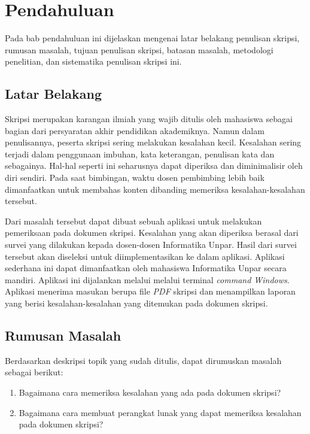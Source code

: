 \chapter{Pendahuluan}
\label{chap:intro}
   
Pada bab pendahuluan ini dijelaskan mengenai latar belakang penulisan skripsi, rumusan masalah, tujuan penulisan skripsi, batasan masalah, metodologi penelitian, dan sistematika penulisan skripsi ini.

\section{Latar Belakang}
\label{sec:label}

Skripsi merupakan karangan ilmiah yang wajib ditulis oleh mahasiswa sebagai bagian dari persyaratan akhir pendidikan akademiknya. Namun dalam penulisannya, peserta skripsi sering melakukan kesalahan kecil. Kesalahan sering terjadi dalam penggunaan imbuhan, kata keterangan, penulisan kata dan sebagainya. Hal-hal seperti ini seharusnya dapat diperiksa dan diminimalisir oleh diri sendiri. Pada saat bimbingan, waktu dosen pembimbing lebih baik dimanfaatkan untuk membahas konten dibanding memeriksa kesalahan-kesalahan tersebut. 

Dari masalah tersebut dapat dibuat sebuah aplikasi untuk melakukan pemeriksaan pada dokumen skripsi. Kesalahan yang akan diperiksa berasal dari survei yang dilakukan kepada dosen-dosen Informatika Unpar. Hasil dari survei tersebut akan diseleksi untuk diimplementasikan ke dalam aplikasi. Aplikasi sederhana ini dapat dimanfaatkan oleh mahasiswa Informatika Unpar secara mandiri. Aplikasi ini dijalankan melalui melalui terminal \textit{command Windows}. Aplikasi menerima masukan berupa file \textit{PDF} skripsi dan menampilkan laporan yang berisi kesalahan-kesalahan yang ditemukan pada dokumen skripsi. 


\section{Rumusan Masalah}
\label{sec:rumusan}
Berdasarkan deskripsi topik yang sudah ditulis, dapat dirumuskan masalah sebagai berikut:
\begin{enumerate}
	\item Bagaimana cara memeriksa kesalahan yang ada pada dokumen skripsi?
	\item Bagaimana cara membuat perangkat lunak yang dapat memeriksa kesalahan pada dokumen skripsi?
\end{enumerate}

